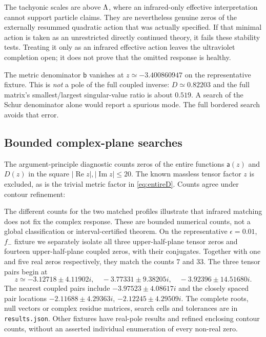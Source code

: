 The tachyonic scales are above $\Lambda$, where an infrared-only effective interpretation cannot support particle claims. They are nevertheless genuine zeros of the externally resummed quadratic action that was actually specified. If that minimal action is taken as an unrestricted directly continued theory, it fails these stability tests. Treating it only as an infrared effective action leaves the ultraviolet completion open; it does not prove that the omitted response is healthy.

The metric denominator $\mathsf b$ vanishes at $z\simeq-3.400860947$ on the representative fixture. This is \emph{not} a pole of the full coupled inverse: $D\simeq0.82203$ and the full matrix's smallest/largest singular-value ratio is about $0.519$. A search of the Schur denominator alone would report a spurious mode. The full bordered search avoids that error.

\subsection{Bounded complex-plane searches}

The argument-principle diagnostic counts zeros of the entire functions $\mathsf a(z)$ and $D(z)$ in the square $|\operatorname{Re}z|,|\operatorname{Im}z|\le20$. The known massless tensor factor $z$ is excluded, as is the trivial metric factor in \eqref{eq:entireD}. Counts agree under contour refinement:
\begin{center}\small\CountTable\end{center}

The different counts for the two matched profiles illustrate that infrared matching does not fix the complex response. These are bounded numerical counts, not a global classification or interval-certified theorem. On the representative $\epsilon=0.01$, $f_-$ fixture we separately isolate all three upper-half-plane tensor zeros and fourteen upper-half-plane coupled zeros, with their conjugates. Together with one and five real zeros respectively, they match the counts 7 and 33. The three tensor pairs begin at
\begin{equation}
 z\simeq-3.12718\pm4.11902i,\quad
 -3.77331\pm9.38205i,\quad
 -3.92396\pm14.51680i.
\end{equation}
The nearest coupled pairs include $-3.97523\pm4.08617i$ and the closely spaced pair locations $-2.11688\pm4.29363i$, $-2.12245\pm4.29509i$. The complete roots, null vectors or complex residue matrices, search cells and tolerances are in \texttt{results.json}. Other fixtures have real-pole results and refined enclosing contour counts, without an asserted individual enumeration of every non-real zero.

